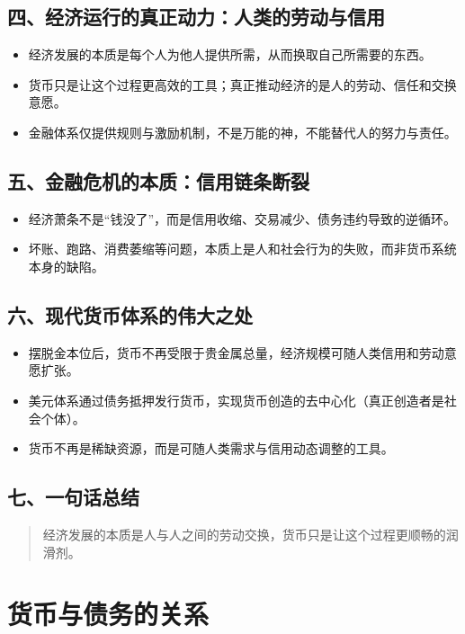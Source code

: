 \subsection{四、经济运行的真正动力：人类的劳动与信用}
\begin{itemize}[nosep]
  \item 经济发展的本质是每个人为他人提供所需，从而换取自己所需要的东西。
  \item 货币只是让这个过程更高效的工具；真正推动经济的是人的劳动、信任和交换意愿。
  \item 金融体系仅提供规则与激励机制，不是万能的神，不能替代人的努力与责任。
\end{itemize}

\subsection{五、金融危机的本质：信用链条断裂}
\begin{itemize}[nosep]
  \item 经济萧条不是“钱没了”，而是信用收缩、交易减少、债务违约导致的逆循环。
  \item 坏账、跑路、消费萎缩等问题，本质上是人和社会行为的失败，而非货币系统本身的缺陷。
\end{itemize}

\subsection{六、现代货币体系的伟大之处}
\begin{itemize}[nosep]
  \item 摆脱金本位后，货币不再受限于贵金属总量，经济规模可随人类信用和劳动意愿扩张。
  \item 美元体系通过债务抵押发行货币，实现货币创造的去中心化（真正创造者是社会个体）。
  \item 货币不再是稀缺资源，而是可随人类需求与信用动态调整的工具。
\end{itemize}

\subsection{七、一句话总结}
\begin{quote}
\centering
经济发展的本质是人与人之间的劳动交换，货币只是让这个过程更顺畅的润滑剂。
\end{quote}


\section{货币与债务的关系}

